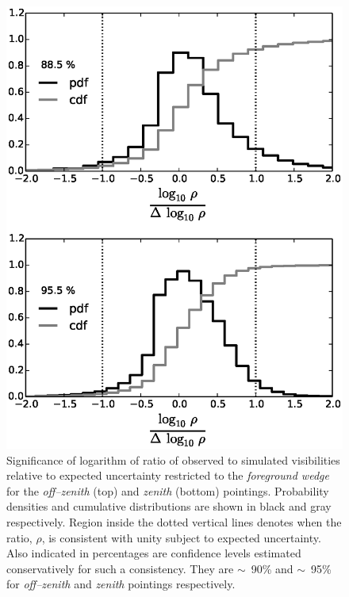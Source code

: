 \documentclass[preprint2,iop,numberedappendix]{emulateapj}
\begin{document}
\begin{figure}[htb]
\centering
\includegraphics[width=\linewidth]{figures/v1_0/delta_array_histogram_wedge_sim_data_snr_log_ratio_0.3m_ground_custom_gaussian_FG_model_asm_all_sky_nside_64_Tsys_90.0K_185.0_MHz_30.7_MHz_bnw2.0.eps}
\caption{Significance of logarithm of ratio of observed to simulated visibilities relative to expected uncertainty restricted to the {\it foreground wedge} for the {\it off--zenith} (top) and {\it zenith} (bottom) pointings. Probability densities and cumulative distributions are shown in black and gray respectively. Region inside the dotted vertical lines denotes when the ratio, $\rho$, is consistent with unity subject to expected uncertainty. Also indicated in percentages are confidence levels estimated conservatively for such a consistency. They are $\sim$~90\% and $\sim$~95\% for {\it off--zenith} and {\it zenith} pointings respectively. \label{fig:data-sim-ratio-snr}}
\end{figure}
\end{document}
